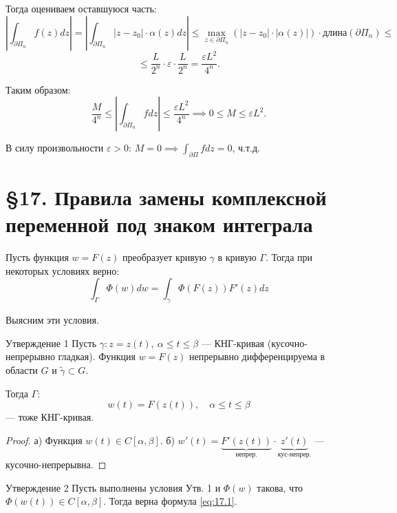 \begin{tproof}
    Тогда оцениваем оставшуюся часть:
    \[
        \left| \int_{\partial \Pi_n} f(z) dz \right| = \left| \int_{\partial \Pi_n} |z - z_0| \cdot \alpha(z) dz \right| \le \max_{z \in \partial \Pi_n} (|z - z_0| \cdot |\alpha(z)|) \cdot \text{длина}(\partial \Pi_n) \le
    \]
    \[
        \le \frac{L}{2^n} \cdot \varepsilon \cdot \frac{L}{2^n} = \frac{\varepsilon L^2}{4^n}.
    \]
    
    Таким образом:
    \[
        \frac{M}{4^n} \le \left| \int_{\partial \Pi_n} f dz \right| \le \frac{\varepsilon L^2}{4^n} \implies 0 \le M \le \varepsilon L^2.
    \]
    
    В силу произвольности $\varepsilon > 0$: $M = 0 \implies \int_{\partial \Pi} f dz = 0$, ч.т.д.
\end{tproof}

\section{§17. Правила замены комплексной переменной под знаком интеграла}

Пусть функция $w = F(z)$ преобразует кривую $\gamma$ в кривую $\Gamma$.
Тогда при некоторых условиях верно:
\begin{equation} \label{eq:17.1}
    \int_{\Gamma} \Phi(w) dw = \int_{\gamma} \Phi(F(z)) F'(z) dz
\end{equation}

Выясним эти условия.

\begin{statement}{Утверждение 1}
    Пусть $\gamma: z = z(t), ~ \alpha \le t \le \beta$ — КНГ-кривая (кусочно-непрерывно гладкая).
    Функция $w = F(z)$ непрерывно дифференцируема в области $G$ и $\tilde{\gamma} \subset G$.
    
    Тогда $\Gamma$:
    \begin{equation} \label{eq:17.2}
        w(t) = F(z(t)), \quad \alpha \le t \le \beta
    \end{equation}
    — тоже КНГ-кривая.
\end{statement}

\begin{proof}
    а) Функция $w(t) \in C[\alpha, \beta]$.
    б) $w'(t) = \underbrace{F'(z(t))}_{\text{непрер.}} \cdot \underbrace{z'(t)}_{\text{кус-непрер.}} $ — кусочно-непрерывна.
\end{proof}

\begin{statement}{Утверждение 2}
    Пусть выполнены условия Утв. 1 и $\Phi(w)$ такова, что $\Phi(w(t)) \in C[\alpha, \beta]$.
    Тогда верна формула \eqref{eq:17.1}.
\end{statement}

